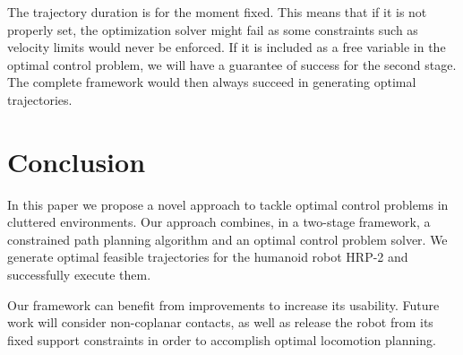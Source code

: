 The trajectory duration is for the moment fixed. This means that if it
is not properly set, the optimization solver might fail as some
constraints such as velocity limits would never be enforced. If it is
included as a free variable in the optimal control problem, we will
have a guarantee of success for the second stage. The complete
framework would then always succeed in generating optimal
trajectories.

\section{Conclusion}
In this paper we propose a novel approach to tackle optimal control
problems in cluttered environments. Our approach combines, in a
two-stage framework, a constrained path planning algorithm and an
optimal control problem solver. We generate optimal feasible
trajectories for the humanoid robot HRP-2 and successfully execute
them.

Our framework can benefit from improvements to increase its
usability. Future work will consider non-coplanar contacts, as well as
release the robot from its fixed support constraints in order to
accomplish optimal locomotion planning.
